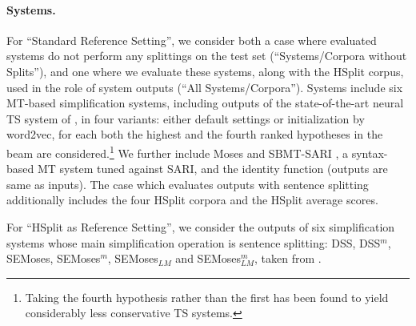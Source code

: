 \documentclass[11pt,a4paper]{article}
\begin{document}
\paragraph{Systems.} \label{sec:systems}
For ``Standard Reference Setting'', we consider both a case where evaluated systems do not perform any splittings on the test set (``Systems/Corpora without Splits''), 
and one where we evaluate these systems, along with the HSplit corpus, used in the role of system outputs (``All Systems/Corpora'').
Systems include six MT-based simplification systems, including outputs of the state-of-the-art neural TS system of \citet{Ni17}, 
 in four variants: either default settings or initialization by word2vec, for each both the highest and the fourth ranked hypotheses in the beam are considered.\footnote{Taking the fourth hypothesis rather than the first has been found to yield considerably less conservative TS systems.}
We further include Moses \citep{K07}
and SBMT-SARI \citep{Xu16}, a syntax-based MT system tuned against SARI, and the identity function (outputs are same as inputs). 
The case which evaluates outputs with sentence splitting additionally includes the four HSplit corpora and the HSplit average scores.

For ``HSplit as Reference Setting'', we consider the outputs of six simplification systems whose main simplification operation is sentence splitting: DSS, DSS$^{m}$, SEMoses, SEMoses$^{m}$, SEMoses$_{LM}$ and SEMoses$_{LM}^m$, taken from \citep{S18acl}. 





\end{document}
